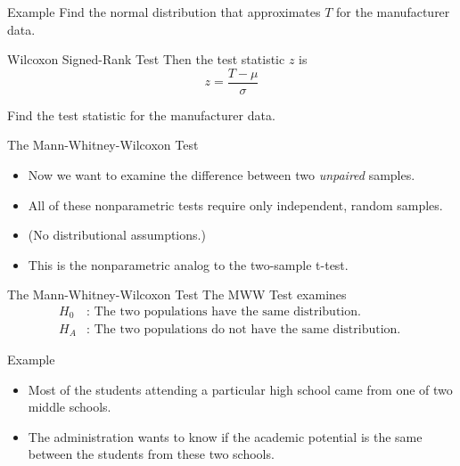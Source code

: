 \begin{frame}{Example}
    Find the normal distribution that approximates $T$ for the manufacturer data. 
\end{frame}

\begin{frame}{Wilcoxon Signed-Rank Test}
    Then the test statistic $z$ is
    \[
        z = \frac{T - \mu}{\sigma}
    \]
    
    \vspace{12pt}Find the test statistic for the manufacturer data. 
\end{frame}

\begin{frame}{The Mann-Whitney-Wilcoxon Test}
    \begin{itemize}
        \item Now we want to examine the difference between two \textit{unpaired} samples.
        \item All of these nonparametric tests require only independent, random samples.
        \item (No distributional assumptions.)
        \item This is the nonparametric analog to the two-sample t-test.
    \end{itemize}
\end{frame}

\begin{frame}{The Mann-Whitney-Wilcoxon Test}
    The MWW Test examines
    \begin{align*}
        H_0&: \text{ The two populations have the same distribution. } \\
        H_A&: \text{ The two populations do not have the same distribution. }
    \end{align*}
\end{frame}

\begin{frame}{Example}
    \begin{itemize}
        \item Most of the students attending a particular high school came from one of two middle schools.
        \item The administration wants to know if the academic potential is the same between the students from these two schools.
    \end{itemize}
\end{frame}

